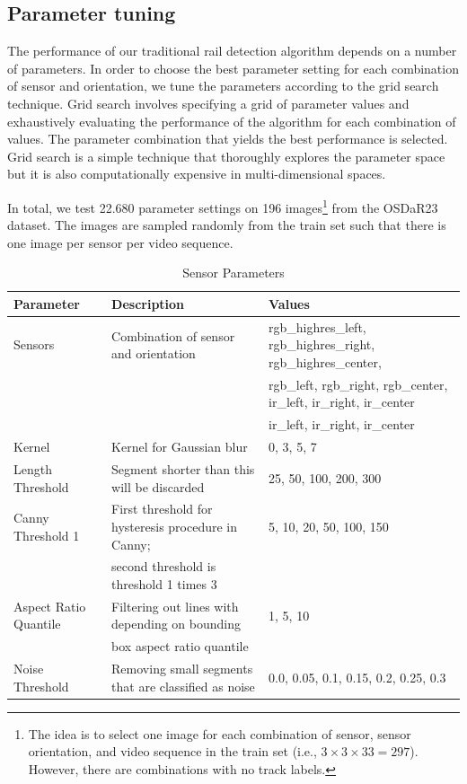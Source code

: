 \documentclass[Master,MDS,english]{BASE/twbook} %
\begin{document}
\subsection{Parameter tuning} \label{sec:fld_parameter}

The performance of our traditional rail detection algorithm depends on a number of parameters. In order to choose the best parameter setting for each combination of sensor and orientation, we tune the parameters according to the grid search technique. Grid search involves specifying a grid of parameter values and exhaustively evaluating the performance of the algorithm for each combination of values. The parameter combination that yields the best performance is selected. Grid search is a simple technique that thoroughly   explores the parameter space but it is also computationally expensive in multi-dimensional spaces.

In total, we test 22.680 parameter settings on 196 images\footnote{The idea is to select one image for each combination of sensor, sensor orientation, and video sequence in the train set (i.e., $3\times3\times33 = 297$). However, there are combinations with no track labels.} from the OSDaR23 dataset. The images are sampled randomly from the train set such that there is one image per sensor per video sequence. 
 
\begin{table}[htbp]
    \centering
    \tiny
    \caption{Sensor Parameters}
    \label{tab:sensor_parameters}
    \begin{tabular}{|l|l|l|}
        \hline
        \textbf{Parameter} & \textbf{Description} & \textbf{Values} \\
        \hline
        Sensors & Combination of sensor and orientation & rgb\_highres\_left, rgb\_highres\_right, rgb\_highres\_center,  \\
                & & rgb\_left, rgb\_right, rgb\_center, ir\_left, ir\_right, ir\_center \\
                 & &  ir\_left, ir\_right, ir\_center \\
        \hline
        Kernel & Kernel for Gaussian blur & 0, 3, 5, 7 \\
        \hline
        Length Threshold & Segment shorter than this will be discarded & 25, 50, 100, 200, 300 \\
        \hline
        Canny Threshold 1 & First threshold for hysteresis procedure in Canny;  & 5, 10, 20, 50, 100, 150 \\
         & second threshold is threshold 1 times 3 &  \\
        \hline
        Aspect Ratio Quantile & Filtering out lines with depending on bounding  & 1, 5, 10 \\
          &  box aspect ratio quantile &  \\
        \hline
        Noise Threshold & Removing small segments that are classified as noise & 0.0, 0.05, 0.1, 0.15, 0.2, 0.25, 0.3 \\
        \hline
    \end{tabular}
\end{table}
\end{document}
